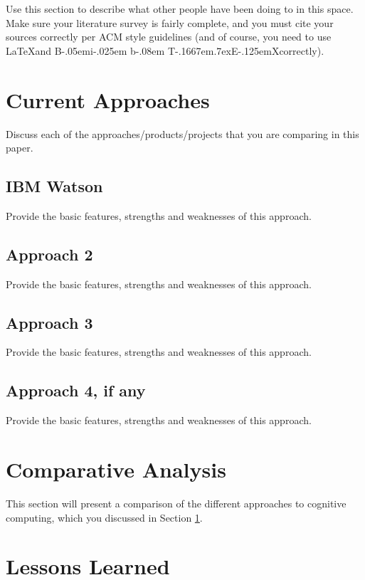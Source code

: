\documentclass{sig-alternate}
\def\BibTeX{{\rm B\kern-.05em{\sc i\kern-.025em b}\kern-.08em
    T\kern-.1667em\lower.7ex\hbox{E}\kern-.125emX}}
\begin{document}
Use this section to describe what other people have been doing to
in this space. Make sure your literature survey is fairly
complete, and you must cite your sources correctly per ACM style
guidelines (and of course, you need to use \LaTeX and \BibTeX correctly).

\section{Current Approaches}
\label{current approaches}

Discuss each of the approaches/products/projects that you are comparing in this paper.

\subsection{IBM Watson}
\label{IBM Watson}
Provide the basic features, strengths and weaknesses of this approach. 


\subsection{Approach 2}
\label{approach 2}
Provide the basic features, strengths and weaknesses of this approach. 


\subsection{Approach 3}
\label{approach 3}
Provide the basic features, strengths and weaknesses of this approach. 



\subsection{Approach 4, if any}
\label{approach 4}
Provide the basic features, strengths and weaknesses of this approach. 



\section{Comparative Analysis}
\label{comparative analysis}

This section will present a comparison of the different approaches to
cognitive computing, which you discussed in Section \ref{current approaches}.


\section{Lessons Learned}
\label{lessons learned}
\end{document}

